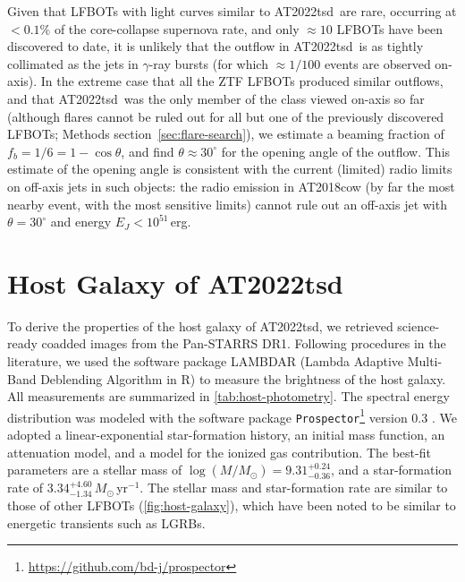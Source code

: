 \documentclass{nature_plusfigure}
\newcommand{\at}{AT2022tsd}
\begin{document}
\begin{methods}
Given that LFBOTs with light curves similar to \at\ are rare, occurring at $<0.1\%$ of the core-collapse supernova rate\cite{Ho2022_RET}, and only $\approx10$ LFBOTs have been discovered to date, it is unlikely that the outflow in \at\ is as tightly collimated as the jets in $\gamma$-ray bursts (for which $\approx1/100$ events are observed on-axis).
In the extreme case that all the ZTF LFBOTs produced similar outflows, and that \at\ was the only member of the class viewed on-axis so far (although flares cannot be ruled out for all but one of the previously discovered LFBOTs; Methods section~\ref{sec:flare-search}), we estimate a beaming fraction of $f_b = 1/6 = 1-\cos{\theta}$, and find $\theta\approx30^{\circ}$ for the opening angle of the outflow. This estimate of the opening angle is consistent with the current (limited) radio limits on off-axis jets in such objects: the radio emission in AT2018cow (by far the most nearby event, with the most sensitive limits) cannot\cite{Margutti2019} rule out an off-axis jet with $\theta=30^{\circ}$ and energy $E_J<10^{51}\,$erg.%

\section{Host Galaxy of \at}
\label{sec:hostgalaxy}

To derive the properties of the host galaxy of \at, we retrieved science-ready coadded images from the Pan-STARRS DR1\cite{Chambers2016}. Following procedures in the literature\cite{Schulze2021}, we used the software package LAMBDAR\cite{Wright2016}  (Lambda Adaptive Multi-Band Deblending Algorithm in R) to measure the brightness of the host galaxy. All measurements are summarized in \ref{tab:host-photometry}. The spectral energy distribution was modeled with the software package \texttt{Prospector}\footnote{\href{https://github.com/bd-j/prospector}{https://github.com/bd-j/prospector}} version 0.3 \cite{Johnson2021}. We adopted a linear-exponential star-formation history, an initial mass function\cite{Chabrier2003}, an attenuation model\cite{Calzetti2000}, and a model\cite{Byler2017} for the ionized gas contribution. 
The best-fit parameters are a stellar mass of $\log(M/M_\odot)=9.31^{+0.24}_{-0.36}$, and a star-formation rate of $3.34^{+4.60}_{-1.34}\,M_\odot\,$yr$^{-1}$.
The stellar mass and star-formation rate are similar to those of other LFBOTs (\ref{fig:host-galaxy}), which have been noted\cite{Coppejans2020,Ho2020_Koala,Perley2021} to be similar to energetic transients such as LGRBs.


\end{methods}
\end{document}
